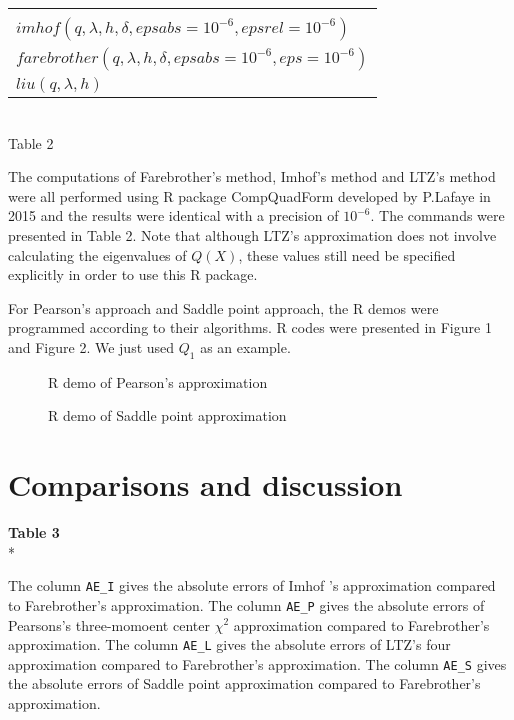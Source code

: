 \documentclass[paper=a4]{article}
\numberwithin{equation}{section}
\begin{document}
\begin{center}	
	\begin{tabular}{l}
		\hline\\
		
		$imhof(q, \lambda, h, \delta ,epsabs = 10^{-6}, epsrel = 10^{-6})$\\
		$farebrother(q, \lambda, h, \delta ,epsabs = 10^{-6}, eps = 10^{-6})$\\
		$liu(q, \lambda, h)$\\
		\hline	
		\end{tabular}	\\
		Table 2
\end{center}	

The computations of Farebrother's method, Imhof's method and LTZ's method were all performed using R package CompQuadForm developed by P.Lafaye in 2015 and the results were identical with a precision of $10^{-6}$. The commands were presented in Table 2. Note that although LTZ's approximation does not involve calculating the eigenvalues of $Q(X)$, these values still need be specified explicitly in order to use this R package.


For Pearson's approach and Saddle point approach, the R demos were programmed according to their algorithms. R codes were presented in Figure 1 and Figure 2. We just used $Q_1$ as an example.
\begin{figure}[h]
	\begin{center}
\caption{R demo of Pearson's approximation}
\end{center}
\end{figure}

\clearpage
\begin{figure}[h]
	\begin{center}
	\caption{R demo of Saddle point approximation}
\end{center}
\end{figure}


\section{Comparisons and discussion}

\textbf{Table 3}
\\*
\begin{small}
The column \texttt{AE\_I} gives the absolute errors of Imhof 's approximation compared to Farebrother's approximation. The column \texttt{AE\_P} gives the absolute errors of Pearsons's three-momoent center $\chi^2$ approximation compared to Farebrother's approximation. The column \texttt{AE\_L} gives the absolute errors of LTZ's four approximation compared to Farebrother's approximation. The column \texttt{AE\_S} gives the absolute errors of Saddle point approximation compared to Farebrother's approximation. 
\end{small}
\end{document}
